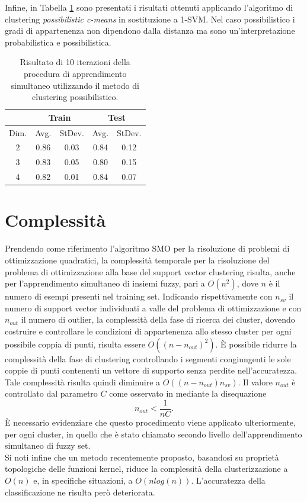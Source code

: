 \documentclass [11pt,a4paper,twoside,openright] {book}
\begin{document}
Infine, in Tabella \ref{pcm} sono presentati i risultati ottenuti applicando l'algoritmo di clustering \textit{possibilistic c-means}\cite{filippone2010applying} in sostituzione a 1-SVM. Nel caso possibilistico i gradi di appartenenza non dipendono dalla distanza ma sono un'interpretazione probabilistica e possibilistica.
\begin{table}[!tb]
\centering%
\caption{Risultato di 10 iterazioni della procedura di apprendimento simultaneo utilizzando il metodo di clustering possibilistico\label{pcm}.}
\begin{tabular}{|c|c|c|c|c|}
\hline
& \multicolumn{2}{|c|}{Train} & \multicolumn{2}{|c|}{Test} \\
\hline
Dim. & Avg. & StDev.& Avg. & StDev. \\
\hline
2 & 0.86 & 0.03 & 0.84 & 0.12   \\
3 & 0.83 & 0.05 & 0.80 & 0.15  \\
4 & 0.82 & 0.01 & 0.84 & 0.07 \\
\hline
\end{tabular}
\end{table}
\section{Complessità}
Prendendo come riferimento l'algoritmo SMO\cite{platt1998sequential} per la risoluzione di problemi di ottimizzazione quadratici, la complessità temporale per la risoluzione del problema di ottimizzazione alla base del support vector clustering risulta, anche per l'apprendimento simultaneo di insiemi fuzzy, pari a $O(n^2)$, dove $n$ è il numero di esempi presenti nel training set. Indicando rispettivamente con $n_{sv}$ il numero di support vector individuati a valle del problema di ottimizzazione e con $n_{out}$ il numero di outlier, la complessità della fase di ricerca dei cluster, dovendo costruire e controllare le condizioni di appartenenza allo stesso cluster per ogni possibile coppia di punti, risulta essere $O((n-n_{out})^2)$. È possibile ridurre la complessità della fase di clustering controllando i segmenti congiungenti le sole coppie di punti contenenti un vettore di supporto senza perdite nell'accuratezza\cite{ben2001support}. Tale complessità risulta quindi diminuire a $O((n-n_{out})n_{sv})$. Il valore $n_{out}$ è controllato dal parametro $C$ come osservato in\cite{ben2001support} mediante la disequazione 
\begin{equation}
n_{out} < \dfrac{1}{nC}.
\end{equation}
È necessario evidenziare che questo procedimento viene applicato ulteriormente, per ogni cluster, in quello che è stato chiamato secondo livello dell'apprendimento simultaneo di fuzzy set.\\
Si noti infine che un metodo recentemente proposto, basandosi su proprietà topologiche delle funzioni kernel\cite{lee2005improved}, riduce la complessità della clusterizzazione a $O(n)$ e, in specifiche situazioni, a $O(nlog(n))$.  L'accuratezza della classificazione ne risulta però deteriorata.
\end{document}
